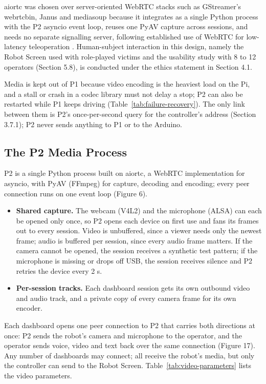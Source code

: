 aiortc was chosen over server-oriented WebRTC stacks such as GStreamer's webrtcbin, Janus and mediasoup because it integrates as a single Python process with the P2 asyncio event loop, reuses one PyAV capture across sessions, and needs no separate signalling server, following established use of WebRTC for low-latency teleoperation \cite{shi2025webrtc}. Human-subject interaction in this design, namely the Robot Screen used with role-played victims and the usability study with 8 to 12 operators (Section 5.8), is conducted under the ethics statement in Section 4.1.

Media is kept out of P1 because video encoding is the heaviest load on the Pi, and a stall or crash in a codec library must not delay a stop; P2 can also be restarted while P1 keeps driving (Table~\ref{tab:failure-recovery}). The only link between them is P2's once-per-second query for the controller's address (Section 3.7.1); P2 never sends anything to P1 or to the Arduino.

\subsection{The P2 Media Process}

P2 is a single Python process built on aiortc, a WebRTC implementation for asyncio, with PyAV (FFmpeg) for capture, decoding and encoding; every peer connection runs on one event loop (Figure 6).

\begin{itemize}
\item \textbf{Shared capture.} The webcam (V4L2) and the microphone (ALSA) can each be opened only once, so P2 opens each device on first use and fans its frames out to every session. Video is unbuffered, since a viewer needs only the newest frame; audio is buffered per session, since every audio frame matters. If the camera cannot be opened, the session receives a synthetic test pattern; if the microphone is missing or drops off USB, the session receives silence and P2 retries the device every 2 s.
\item \textbf{Per-session tracks.} Each dashboard session gets its own outbound video and audio track, and a private copy of every camera frame for its own encoder.
\end{itemize}

Each dashboard opens one peer connection to P2 that carries both directions at once: P2 sends the robot's camera and microphone to the operator, and the operator sends voice, video and text back over the same connection (Figure 17). Any number of dashboards may connect; all receive the robot's media, but only the controller can send to the Robot Screen. Table~\ref{tab:video-parameters} lists the video parameters.

